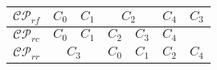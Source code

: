 \begin{tabular}{c|c|c|c|c|}
	\hline
	$\mathcal{C}\mathcal{P}_{rf}$ & $C_{0} \quad C_{1}$ & $C_{2}$ & $C_{4}$ & $C_{3}$ \\
	\hline
	$\mathcal{C}\mathcal{P}_{rc}$ & $C_{0} \quad C_{1}$ & $C_{2} \quad C_{3}$ & $C_{4}$ & \\
	\hline
	$\mathcal{C}\mathcal{P}_{rr}$ & $C_{3}$ & $C_{0} \quad C_{1}$ & $C_{2}$ & $C_{4}$ \\
	\hline
\end{tabular}
